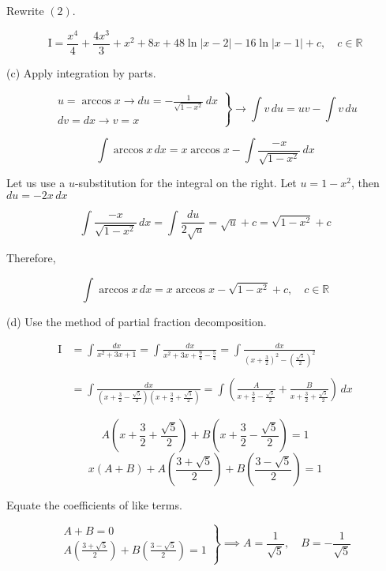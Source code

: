 \documentclass{article}
\begin{document}
\hfill

\noindent Rewrite $(2)$.

\[\mathrm{I}=\boxed{\frac{x^4}4+\frac{4x^3}3+x^2+8x+48\ln|x-2|-16\ln|x-1|+c,\quad c\in\mathbb{R}}\]

\hfill

\noindent (c) Apply integration by parts.

\[\left.\begin{array}{c}
\displaystyle u=\arccos x\rightarrow du=-\frac1{\sqrt{1-x^2}}\,dx\\
\displaystyle dv=dx\rightarrow v=x
\end{array}\right\}\rightarrow\int v\,du=uv-\int v\,du\]

\[\int\arccos x\,dx=x\arccos x-\int\frac{-x}{\sqrt{1-x^2}}\,dx\]

\hfill

\noindent Let us use a $u$-substitution for the integral on the right. Let $u=1-x^2$, then $du=-2x\,dx$

\[\int\frac{-x}{\sqrt{1-x^2}}\,dx=\int\frac{du}{2\sqrt u}=\sqrt u+c=\sqrt{1-x^2}+c\]

\hfill

\noindent Therefore,

\[\int\arccos x\,dx=\boxed{x\arccos x-\sqrt{1-x^2}+c,\quad c\in\mathbb{R}}\]

\hfill

\noindent (d) Use the method of partial fraction decomposition.

\begin{align*}\mathrm{I}&=\int\frac{dx}{x^2+3x+1}=\int\frac{dx}{x^2+3x+\frac94-\frac54}=\int\frac{dx}{\left(x+\frac32\right)^2-\left(\frac{\sqrt5}2\right)^2}\\\\&=\int\frac{dx}{\left(x+\frac32-\frac{\sqrt5}2\right)\left(x+\frac32+\frac{\sqrt5}2\right)}=\int\left(\frac A{x+\frac32-\frac{\sqrt5}2}+\frac B{x+\frac32+\frac{\sqrt5}2}\right)\,dx\end{align*}

\hfill

\[A\left(x+\frac32+\frac{\sqrt5}2\right)+B\left(x+\frac32-\frac{\sqrt5}2\right)=1\]
\[x(A+B)+A\left(\frac{3+\sqrt5}2\right)+B\left(\frac{3-\sqrt5}2\right)=1\]

\hfill

\noindent Equate the coefficients of like terms.

\[\left.\begin{array}{c}
A+B=0\\
A\left(\frac{3+\sqrt5}2\right)+B\left(\frac{3-\sqrt5}2\right)=1
\end{array}\right\}\implies A=\frac1{\sqrt5},\quad B=-\frac1{\sqrt5}\]
\end{document}
